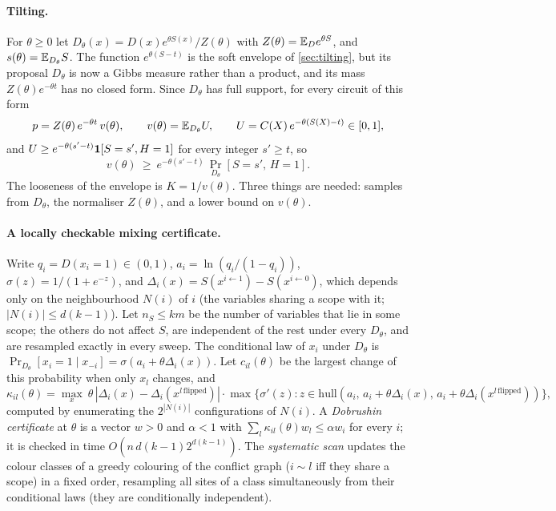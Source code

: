 \paragraph{Tilting.} For $\theta\ge0$ let $D_\theta(x)=D(x)e^{\theta S(x)}/Z(\theta)$
with $Z(\theta)=\mathbb{E}_De^{\theta S}$, and $s(\theta)=\mathbb{E}_{D_\theta}S$. The function
$e^{\theta(S-t)}$ is the soft envelope of \cref{sec:tilting}, but its proposal
$D_\theta$ is now a Gibbs measure rather than a product, and its mass
$Z(\theta)e^{-\theta t}$ has no closed form. Since $D_\theta$ has full support,
for every circuit of this form
\begin{equation}\label{eq:local-identity}
p=Z(\theta)\,e^{-\theta t}\,v(\theta),\qquad v(\theta)=\mathbb{E}_{D_\theta}U,\qquad
U=C(X)\,e^{-\theta(S(X)-t)}\in[0,1],
\end{equation}
and $U\ge e^{-\theta(s'-t)}\mathbf{1}[S=s',H=1]$ for every integer $s'\ge t$, so
\begin{equation}\label{eq:local-anti}
v(\theta)\ \ge\ e^{-\theta(s'-t)}\,\Pr_{D_\theta}[S=s',\,H=1].
\end{equation}
The looseness of the envelope is $K=1/v(\theta)$. Three things are needed:
samples from $D_\theta$, the normaliser $Z(\theta)$, and a lower bound on $v(\theta)$.

\paragraph{A locally checkable mixing certificate.} Write $q_i=D(x_i=1)\in(0,1)$,
$a_i=\ln(q_i/(1-q_i))$, $\sigma(z)=1/(1+e^{-z})$, and
$\Delta_i(x)=S(x^{i\gets1})-S(x^{i\gets0})$, which depends only on the
neighbourhood $N(i)$ of $i$ (the variables sharing a scope with it;
$|N(i)|\le d(k-1)$). Let $n_S\le km$ be the number of variables that lie in some
scope; the others do not affect $S$, are independent of the rest under every
$D_\theta$, and are resampled exactly in every sweep. The conditional law of $x_i$ under $D_\theta$ is
$\Pr_{D_\theta}[x_i=1\mid x_{-i}]=\sigma(a_i+\theta\Delta_i(x))$. Let
$c_{il}(\theta)$ be the largest change of this probability when only $x_l$
changes, and
\[
\kappa_{il}(\theta)=\max_{x}\ \theta\,|\Delta_i(x)-\Delta_i(x^{l\,\mathrm{flipped}})|\cdot
\max\{\sigma'(z):z\in\mathrm{hull}(a_i,\,a_i+\theta\Delta_i(x),\,a_i+\theta\Delta_i(x^{l\,\mathrm{flipped}}))\},
\]
computed by enumerating the $2^{|N(i)|}$ configurations of $N(i)$. A
\emph{Dobrushin certificate} at $\theta$ is a vector $w>0$ and $\alpha<1$ with
$\sum_l\kappa_{il}(\theta)w_l\le\alpha w_i$ for every $i$; it is checked in time
$O(n\,d(k-1)2^{d(k-1)})$. The \emph{systematic scan} updates the colour classes of
a greedy colouring of the conflict graph ($i\sim l$ iff they share a scope) in a
fixed order, resampling all sites of a class simultaneously from their
conditional laws (they are conditionally independent).

